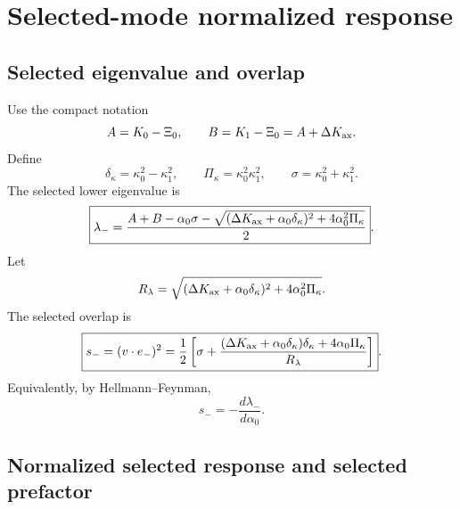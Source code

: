 \section{Selected-mode normalized response}
\label{sec:part02_conservative_response:selected-mode-normalized-response}

\subsection{Selected eigenvalue and overlap}
\label{subsec:part02-stage030-selected-eigenvalue}

Use the compact notation
\begin{equation}
\label{eq:part02-stage13-AB}
A=K_0-\Xi_0,
\qquad
B=K_1-\Xi_0=A+\Delta K_{\rm ax}.
\end{equation}
Define
\begin{equation}
\delta_\kappa=\kappa_0^2-\kappa_1^2,
\qquad
\Pi_\kappa=\kappa_0^2\kappa_1^2,
\qquad
\sigma=\kappa_0^2+\kappa_1^2.
\end{equation}
The selected lower eigenvalue is
\begin{equation}
\label{eq:part02-lambda-minus}
\boxed{
\lambda_-
=
\frac{A+B-\alpha_0\sigma-
\sqrt{(\Delta K_{\rm ax}+\alpha_0\delta_\kappa)^2+4\alpha_0^2\Pi_\kappa}}
{2}}.
\end{equation}
Let
\begin{equation}
R_\lambda=
\sqrt{(\Delta K_{\rm ax}+\alpha_0\delta_\kappa)^2+4\alpha_0^2\Pi_\kappa}.
\end{equation}
The selected overlap is
\begin{equation}
\label{eq:part02-s-minus}
\boxed{
 s_-
=(v\cdot e_-)^2
=
\frac12\left[
\sigma+
\frac{(\Delta K_{\rm ax}+\alpha_0\delta_\kappa)\delta_\kappa+4\alpha_0\Pi_\kappa}{R_\lambda}
\right]}.
\end{equation}
Equivalently, by Hellmann--Feynman,
\begin{equation}
\label{eq:part02-HF}
\boxed{
 s_-=-\frac{d\lambda_-}{d\alpha_0}}.
\end{equation}

\subsection{Normalized selected response and selected prefactor}
\label{subsec:part02-selected-normalized-response}

